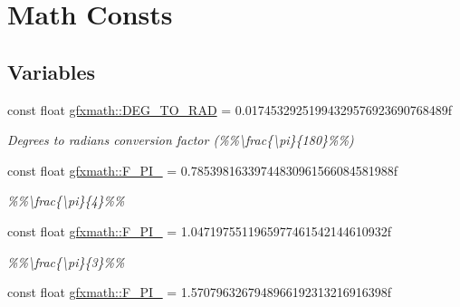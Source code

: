 \hypertarget{group___math_consts}{}\section{Math Consts}
\label{group___math_consts}
\subsection*{Variables}
\begin{DoxyCompactItemize}
\item 
\hypertarget{group___math_consts_ga775ec2b017832b9f00808716a8a5678d}{}const float \hyperlink{group___math_consts_ga775ec2b017832b9f00808716a8a5678d}{gfxmath\+::\+D\+E\+G\+\_\+\+T\+O\+\_\+\+R\+A\+D} = 0.\+01745329251994329576923690768489f\label{group___math_consts_ga775ec2b017832b9f00808716a8a5678d}

\begin{DoxyCompactList}\small\item\em Degrees to radians conversion factor (\%\%\textbackslash{}frac\{\textbackslash{}pi\}\{180\}\%\%) \end{DoxyCompactList}\item 
\hypertarget{group___math_consts_ga25da08d770169dc837f7e766a4af50c7}{}const float \hyperlink{group___math_consts_ga25da08d770169dc837f7e766a4af50c7}{gfxmath\+::\+F\+\_\+\+P\+I\+\_} = 0.\+78539816339744830961566084581988f\label{group___math_consts_ga25da08d770169dc837f7e766a4af50c7}

\begin{DoxyCompactList}\small\item\em \%\%\textbackslash{}frac\{\textbackslash{}pi\}\{4\}\%\% \end{DoxyCompactList}\item 
\hypertarget{group___math_consts_ga55f78cc108bc6d4c3338b9a5605ea23e}{}const float \hyperlink{group___math_consts_ga55f78cc108bc6d4c3338b9a5605ea23e}{gfxmath\+::\+F\+\_\+\+P\+I\+\_} = 1.\+0471975511965977461542144610932f\label{group___math_consts_ga55f78cc108bc6d4c3338b9a5605ea23e}

\begin{DoxyCompactList}\small\item\em \%\%\textbackslash{}frac\{\textbackslash{}pi\}\{3\}\%\% \end{DoxyCompactList}\item 
\hypertarget{group___math_consts_ga0c8bf8cc8172c063476b12e41af90fdd}{}const float \hyperlink{group___math_consts_ga0c8bf8cc8172c063476b12e41af90fdd}{gfxmath\+::\+F\+\_\+\+P\+I\+\_} = 1.\+5707963267948966192313216916398f\label{group___math_consts_ga0c8bf8cc8172c063476b12e41af90fdd}


\end{DoxyCompactItemize}
